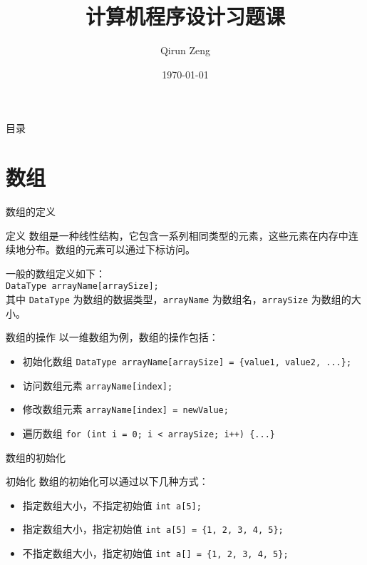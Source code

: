 \documentclass{beamer}
\title{计算机程序设计习题课}
\author{Qirun Zeng}
\date{\today}
\begin{document}
\begin{frame}
    \titlepage
\end{frame}

\begin{frame}{目录}
    \tableofcontents
\end{frame}


\section{数组}
\begin{frame}{数组的定义}
    \begin{block}{定义}
        数组是一种线性结构，它包含一系列相同类型的元素，这些元素在内存中连续地分布。数组的元素可以通过下标访问。
    \end{block}
    一般的数组定义如下： \\
    \texttt{DataType arrayName[arraySize];} \\
    其中 \texttt{DataType} 为数组的数据类型，\texttt{arrayName} 为数组名，\texttt{arraySize} 为数组的大小。
\end{frame}

\begin{frame}{数组的操作}
    以一维数组为例，数组的操作包括：
    \begin{itemize}
        \item<1-> 初始化数组
        \texttt{DataType arrayName[arraySize] = \{value1, value2, ...\};} \\
        \item<2-> 访问数组元素
        \texttt{arrayName[index];} \\
        \item<3-> 修改数组元素
        \texttt{arrayName[index] = newValue;} \\
        \item<4-> 遍历数组
        \texttt{for (int i = 0; i < arraySize; i++) \{...\}} \\
    \end{itemize}
\end{frame}

\begin{frame}{数组的初始化}
    \begin{block}{初始化}
        数组的初始化可以通过以下几种方式：
        \begin{itemize}
            \item<1-> 指定数组大小，不指定初始值
            \texttt{int a[5];} \\
            \item<2-> 指定数组大小，指定初始值
            \texttt{int a[5] = \{1, 2, 3, 4, 5\};} \\
            \item<3-> 不指定数组大小，指定初始值
            \texttt{int a[] = \{1, 2, 3, 4, 5\};} \\
        \end{itemize}
    \end{block}
\end{frame}
\end{document}

